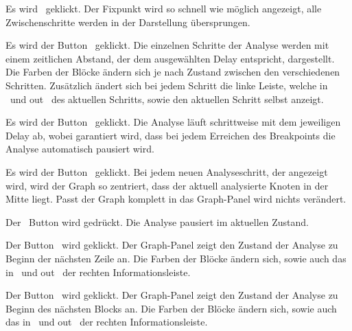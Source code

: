 \tests{}

{Es wird \faPlay\ geklickt.}
{Der Fixpunkt wird so schnell wie möglich angezeigt, alle Zwischenschritte werden in der Darstellung übersprungen.}

{Es wird der Button \faPlay\ geklickt.}
{Die einzelnen Schritte der Analyse werden mit einem zeitlichen Abstand, der dem ausgewählten Delay entspricht, dargestellt. Die Farben der Blöcke ändern sich je nach Zustand zwischen den verschiedenen Schritten. Zusätzlich ändert sich bei jedem Schritt die linke Leiste, welche \glqq in \grqq\ und \glqq out \grqq\ des aktuellen Schritts, sowie den aktuellen Schritt selbst anzeigt.}

{Es wird der Button \faPlay\ geklickt.}
{Die Analyse läuft schrittweise mit dem jeweiligen Delay ab, wobei garantiert wird, dass bei jedem Erreichen des Breakpoints die Analyse automatisch pausiert wird.}

{Es wird der Button \faPlay\ geklickt.}
{Bei jedem neuen Analyseschritt, der angezeigt wird, wird der Graph so zentriert, dass der aktuell analysierte Knoten in der Mitte liegt. Passt der Graph komplett in das Graph-Panel wird nichts verändert.}


\tests{}

{Der \faStop\ Button wird gedrückt.}
{Die Analyse pausiert im aktuellen Zustand.}

{Der Button \faForward\ wird geklickt.}
{Der Graph-Panel zeigt den Zustand der Analyse zu Beginn der nächsten Zeile an. Die Farben der Blöcke ändern sich, sowie auch das \glqq in \grqq\ und \glqq out \grqq\ der rechten Informationsleiste.}

{Der Button \faFastForward\ wird geklickt.}
{Der Graph-Panel zeigt den Zustand der Analyse zu Beginn des nächsten Blocks an. Die Farben der Blöcke ändern sich, sowie auch das \glqq in \grqq\ und \glqq out \grqq\ der rechten Informationsleiste.}


